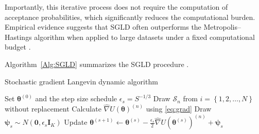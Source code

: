 Importantly, this iterative process does not require the computation of acceptance probabilities, which significantly reduces the computational burden. Empirical evidence suggests that SGLD often outperforms the Metropolis–Hastings algorithm when applied to large datasets under a fixed computational budget \cite{li2016scalable}.

Algorithm~\ref{Alg:SGLD} summarizes the SGLD procedure \cite{nemeth2021stochastic}. 

\begin{algorithm}[h!]
	\caption{Stochastic gradient Langevin dynamic algorithm}\label{Alg:SGLD}
	\begin{algorithmic}[1]
		\State Set $\bm{\theta}^{(0)}$ and the step size schedule $\epsilon_s=S^{-1/3}$  		 			
		\State Draw $\mathcal{S}_n$ from $i=\left\{1,2,\dots,N\right\}$ without replacement
		\State Calculate $\hat{\nabla} U(\boldsymbol{\theta})^{(n)}$ using \ref{eq:grad}  
		\State Draw $\boldsymbol{\psi}_s\sim N(\mathbf{0},\epsilon_s\mathbf{I}_K)$
		\State Update $\boldsymbol{\theta}^{(s+1)}\leftarrow \boldsymbol{\theta}^{(s)} -\frac{\epsilon_s}{2}\hat{\nabla} U(\boldsymbol{\theta}^{(s)})^{(n)}+\boldsymbol{\psi}_s$
		\EndFor 
	\end{algorithmic} 
\end{algorithm}
 

